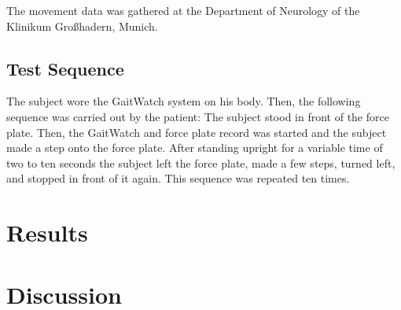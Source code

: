 The movement data was gathered at the Department of Neurology of the Klinikum Großhadern, Munich.

\subsection{Test Sequence}

The subject wore the GaitWatch system on his body. Then, the following sequence was carried out by the patient: The subject stood in front of the force plate. Then, the GaitWatch and force plate record was started and the subject made a step onto the force plate. After standing upright for a variable time of two to ten seconds the subject left the force plate, made a few steps, turned left, and stopped in front of it again. This sequence was repeated ten times.

\section{Results}

\section{Discussion}

